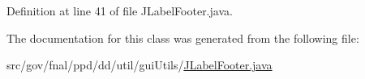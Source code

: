 Definition at line 41 of file J\-Label\-Footer.\-java.



The documentation for this class was generated from the following file\-:\begin{DoxyCompactItemize}
\item 
src/gov/fnal/ppd/dd/util/gui\-Utils/\hyperlink{JLabelFooter_8java}{J\-Label\-Footer.\-java}\end{DoxyCompactItemize}
